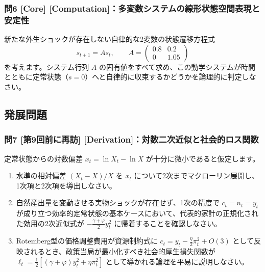 \documentclass[
  japanese,
  lualatex,
  ja=standard,
  12pt,
  a4paper]{ltjsarticle}
\providecommand{\tightlist}{%
  \setlength{\itemsep}{0pt}\setlength{\parskip}{0pt}}
\begin{document}

\subsubsection{問6 {[}Core{]}
{[}Computation{]}：多変数システムの線形状態空間表現と安定性}\label{ux554f6-core-computationux591aux5909ux6570ux30b7ux30b9ux30c6ux30e0ux306eux7ddaux5f62ux72b6ux614bux7a7aux9593ux8868ux73feux3068ux5b89ux5b9aux6027}

新たな外生ショックが存在しない自律的な2変数の状態遷移方程式 \[
s_{t+1}=As_t,
\qquad
A=
\begin{pmatrix}
0.8 & 0.2\\
0 & 1.05
\end{pmatrix}
\] を考えます。システム行列 \(A\)
の固有値をすべて求め、この動学システムが時間とともに定常状態（\(s=0\)）へと自律的に収束するかどうかを論理的に判定しなさい。

\subsection{発展問題}\label{ux767aux5c55ux554fux984c}

\subsubsection{問7 {[}第9回前に再訪{]}
{[}Derivation{]}：対数二次近似と社会的ロス関数}\label{ux554f7-ux7b2c9ux56deux524dux306bux518dux8a2a-derivationux5bfeux6570ux4e8cux6b21ux8fd1ux4f3cux3068ux793eux4f1aux7684ux30edux30b9ux95a2ux6570}

定常状態からの対数偏差 \(x_t=\ln X_t-\ln X\)
が十分に微小であると仮定します。

\begin{enumerate}
\def\labelenumi{\arabic{enumi}.}
\tightlist
\item
  水準の相対偏差 \((X_t-X)/X\) を \(x_t\)
  について2次までマクローリン展開し、1次項と2次項を導出しなさい。
\item
  自然産出量を変動させる実物ショックが存在せず、1次の精度で
  \(c_t=n_t=y_t\)
  が成り立つ効率的定常状態の基本ケースにおいて、代表的家計の正規化された効用の2次近似式が
  \(-\frac{\gamma+\varphi}{2}y_t^2\) に帰着することを確認しなさい。
\item
  Rotemberg型の価格調整費用が資源制約式に
  \(c_t=y_t-\frac{\eta}{2}\pi_t^2+O(3)\)
  として反映されるとき、政策当局が最小化すべき社会的厚生損失関数が
  \(\ell_t=\frac{1}{2}\left[(\gamma+\varphi)y_t^2+\eta\pi_t^2\right]\)
  として導かれる論理を平易に説明しなさい。
\end{enumerate}
\end{document}
